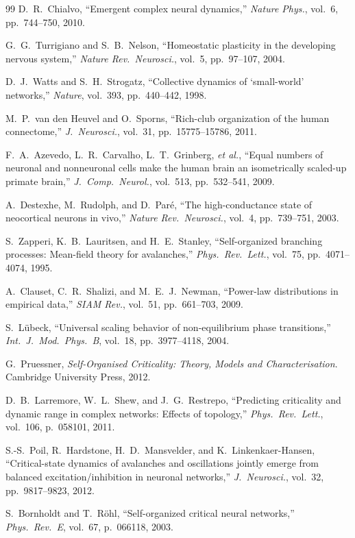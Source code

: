 \documentclass[12pt,a4paper]{article}
\begin{document}
\begin{thebibliography}{99}
  D.~R.~Chialvo,
  ``Emergent complex neural dynamics,''
  \textit{Nature Phys.}, vol.~6, pp.~744--750, 2010.

  G.~G.~Turrigiano and S.~B.~Nelson,
  ``Homeostatic plasticity in the developing nervous system,''
  \textit{Nature Rev.\ Neurosci.}, vol.~5, pp.~97--107, 2004.

  D.~J.~Watts and S.~H.~Strogatz,
  ``Collective dynamics of `small-world' networks,''
  \textit{Nature}, vol.~393, pp.~440--442, 1998.

  M.~P.~van den Heuvel and O.~Sporns,
  ``Rich-club organization of the human connectome,''
  \textit{J.\ Neurosci.}, vol.~31, pp.~15775--15786, 2011.

  F.~A.~Azevedo, L.~R.~Carvalho, L.~T.~Grinberg, \textit{et al.},
  ``Equal numbers of neuronal and nonneuronal cells make the human brain
    an isometrically scaled-up primate brain,''
  \textit{J.\ Comp.\ Neurol.}, vol.~513, pp.~532--541, 2009.

  A.~Destexhe, M.~Rudolph, and D.~Paré,
  ``The high-conductance state of neocortical neurons in vivo,''
  \textit{Nature Rev.\ Neurosci.}, vol.~4, pp.~739--751, 2003.

  S.~Zapperi, K.~B.~Lauritsen, and H.~E.~Stanley,
  ``Self-organized branching processes: Mean-field theory for avalanches,''
  \textit{Phys.\ Rev.\ Lett.}, vol.~75, pp.~4071--4074, 1995.

  A.~Clauset, C.~R.~Shalizi, and M.~E.~J.~Newman,
  ``Power-law distributions in empirical data,''
  \textit{SIAM Rev.}, vol.~51, pp.~661--703, 2009.

  S.~L{\"u}beck,
  ``Universal scaling behavior of non-equilibrium phase transitions,''
  \textit{Int.\ J.\ Mod.\ Phys.\ B}, vol.~18, pp.~3977--4118, 2004.

  G.~Pruessner,
  \textit{Self-Organised Criticality: Theory, Models and Characterisation}.
  Cambridge University Press, 2012.

  D.~B.~Larremore, W.~L.~Shew, and J.~G.~Restrepo,
  ``Predicting criticality and dynamic range in complex networks:
    Effects of topology,''
  \textit{Phys.\ Rev.\ Lett.}, vol.~106, p.~058101, 2011.

  S.-S.~Poil, R.~Hardstone, H.~D.~Mansvelder, and K.~Linkenkaer-Hansen,
  ``Critical-state dynamics of avalanches and oscillations jointly
    emerge from balanced excitation/inhibition in neuronal networks,''
  \textit{J.\ Neurosci.}, vol.~32, pp.~9817--9823, 2012.

  S.~Bornholdt and T.~Röhl,
  ``Self-organized critical neural networks,''
  \textit{Phys.\ Rev.\ E}, vol.~67, p.~066118, 2003.

\end{thebibliography}
\end{document}
